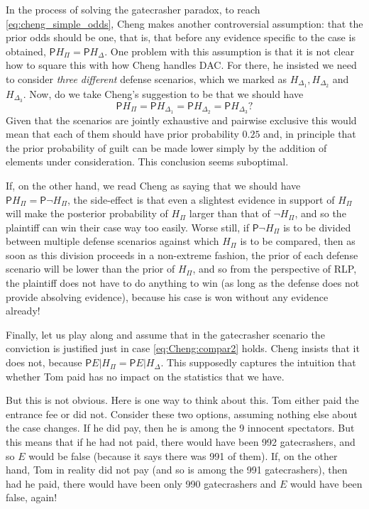 \documentclass[10pt,dvipsnames,enabledeprecatedfontcommands]{scrartcl}
\newcommand{\n}{\neg}
\newcommand{\pr}{\mathsf{P}}
\begin{document}
In the process of solving the gatecrasher paradox, to reach
\eqref{eq:cheng_simple_odds}, Cheng makes another controversial
assumption: that the prior odds should be one, that is, that before any
evidence specific to the case is obtained, \(\pr{H_\Pi}=\pr{H_\Delta}\).
One problem with this assumption is that it is not clear how to square
this with how Cheng handles DAC. For there, he insisted we need to
consider \emph{three different} defense scenarios, which we marked as
\(H_{\Delta_1}, H_{\Delta_2}\) and \(H_{\Delta_3}\). Now, do we take
Cheng's suggestion to be that we should have
\[\pr{H_\Pi}=\pr{H_{\Delta_1}}= \pr{H_{\Delta_2}}=\pr{H_{\Delta_3}}?\]
\noindent Given that the scenarios are jointly exhaustive and pairwise
exclusive this would mean that each of them should have prior
probability \(0.25\) and, in principle that the prior probability of
guilt can be made lower simply by the addition of elements under
consideration. This conclusion seems suboptimal.

If, on the other hand, we read Cheng as saying that we should have
\(\pr{H_\Pi}=\pr{\n H_\Pi}\), the side-effect is that even a slightest
evidence in support of \(H_\Pi\) will make the posterior probability of
\(H_\Pi\) larger than that of \(\n H_\Pi\), and so the plaintiff can win
their case way too easily. Worse still, if \(\pr{\n H_\Pi}\) is to be
divided between multiple defense scenarios against which \(H_\Pi\) is to
be compared, then as soon as this division proceeds in a non-extreme
fashion, the prior of each defense scenario will be lower than the prior
of \(H_\Pi\), and so from the perspective of RLP, the plaintiff does not
have to do anything to win (as long as the defense does not provide
absolving evidence), because his case is won without any evidence
already!

Finally, let us play along and assume that in the gatecrasher scenario
the conviction is justified just in case \eqref{eq:Cheng:compar2} holds.
Cheng insists that it does not, because
\(\pr{E\vert H_\Pi}=\pr{E\vert H_\Delta}\). This supposedly captures the
intuition that whether Tom paid has no impact on the statistics that we
have.

But this is not obvious. Here is one way to think about this. Tom either
paid the entrance fee or did not. Consider these two options, assuming
nothing else about the case changes. If he did pay, then he is among the
9 innocent spectators. But this means that if he had not paid, there
would have been 992 gatecrashers, and so \(E\) would be false (because
it says there was 991 of them). If, on the other hand, Tom in reality
did not pay (and so is among the 991 gatecrashers), then had he paid,
there would have been only 990 gatecrashers and \(E\) would have been
false, again!
\end{document}
